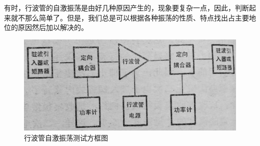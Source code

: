 有时，行波管的自激振荡是由好几种原因产生的，现象要复杂一点，因此，判断起来就不那么简单了。但是，我们总是可以根据各种振荡的性质、特点找出占主要地位的原因然后加以解决的。






\begin{figure}[phtb]
	\centering
	\includegraphics[width=0.65\linewidth]{figure/ch5-6}
	\caption{行波管自激振荡测试方框图}
	\label{ch5-6}
\end{figure}